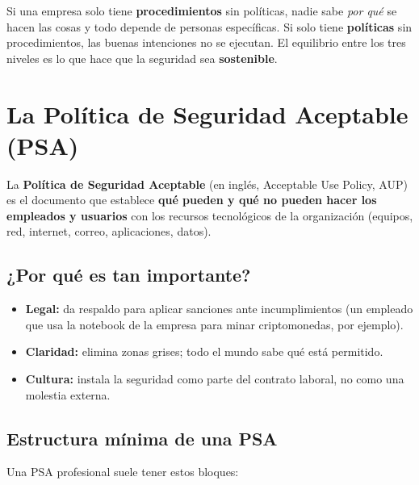 \documentclass[12pt,a4paper]{article}
\begin{document}
\begin{cajaGobierno}[title={Por qu\'e importa el orden}]
Si una empresa solo tiene \textbf{procedimientos} sin pol\'iticas, nadie sabe \emph{por qu\'e} se hacen las cosas y todo depende de personas espec\'ificas. Si solo tiene \textbf{pol\'iticas} sin procedimientos, las buenas intenciones no se ejecutan. El equilibrio entre los tres niveles es lo que hace que la seguridad sea \textbf{sostenible}.
\end{cajaGobierno}

\newpage
\section{La Pol\'itica de Seguridad Aceptable (PSA)}

\begin{cajaDefinicion}
La \textbf{Pol\'itica de Seguridad Aceptable} (en ingl\'es, Acceptable Use Policy, AUP) es el documento que establece \textbf{qu\'e pueden y qu\'e no pueden hacer los empleados y usuarios} con los recursos tecnol\'ogicos de la organizaci\'on (equipos, red, internet, correo, aplicaciones, datos).
\end{cajaDefinicion}

\subsection{¿Por qu\'e es tan importante?}
\begin{itemize}[leftmargin=2em]
    \item \textbf{Legal:} da respaldo para aplicar sanciones ante incumplimientos (un empleado que usa la notebook de la empresa para minar criptomonedas, por ejemplo).
    \item \textbf{Claridad:} elimina zonas grises; todo el mundo sabe qu\'e est\'a permitido.
    \item \textbf{Cultura:} instala la seguridad como parte del contrato laboral, no como una molestia externa.
\end{itemize}

\subsection{Estructura m\'inima de una PSA}

Una PSA profesional suele tener estos bloques:
\end{document}
